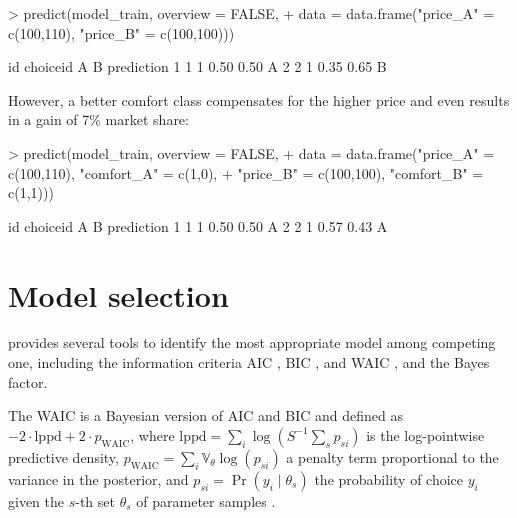 \documentclass[article,shortnames]{jss}
\begin{document}
\begin{Schunk}
\begin{Sinput}
> predict(model_train, overview = FALSE,
+          data = data.frame("price_A" = c(100,110), "price_B" = c(100,100)))
\end{Sinput}
\begin{Soutput}
  id choiceid    A    B prediction
1  1        1 0.50 0.50          A
2  2        1 0.35 0.65          B
\end{Soutput}
\end{Schunk}

However, a better comfort class compensates for the higher price and even results in a gain of 7\% market share:

\begin{Schunk}
\begin{Sinput}
> predict(model_train, overview = FALSE,
+          data = data.frame("price_A" = c(100,110), "comfort_A" = c(1,0),
+                            "price_B" = c(100,100), "comfort_B" = c(1,1)))
\end{Sinput}
\begin{Soutput}
  id choiceid    A    B prediction
1  1        1 0.50 0.50          A
2  2        1 0.57 0.43          A
\end{Soutput}
\end{Schunk}

\section{Model selection} \label{sec:model_selection}

 provides several tools to identify the most appropriate model among competing one, including the information criteria AIC \citep{Akaike:1974}, BIC \citep{Schwarz:1978}, and WAIC \citep{Watanabe:2010}, and the Bayes factor.

The WAIC is a Bayesian version of AIC and BIC and defined as $-2 \cdot \text{lppd} + 2\cdot p_\text{WAIC}$, where $\text{lppd} = \sum_i \log \left( S^{-1} \sum_s p_{si} \right)$ is the log-pointwise predictive density, $p_\text{WAIC} = \sum_i \mathbb{V}_{\theta} \log (p_{si})$ a penalty term proportional to the variance in the posterior, and $p_{si} = \Pr(y_i\mid \theta_s)$ the probability of choice $y_i$ given the $s$-th set $\theta_s$ of parameter samples \citep[p.\ 220]{McElreath:2016}.
\end{document}
